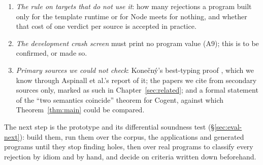 \begin{enumerate}
decides whether a value-conditional summary is worth its cost; the promises themselves are kept (O2).
\item \emph{The rule on targets that do not use it}: how many rejections a program built only for the
template runtime or for Node meets for nothing, and whether that cost of one verdict per source is
accepted in practice.
\item \emph{The development crash screen} must print no program value (A9); this is to be confirmed, or
made so.
\item \emph{Primary sources we could not check}: Kone\v{c}n\'y's best-typing proof
\citep{konecny2003typing}, which we know through Aspinall et al.'s report of it; the papers we cite from
secondary sources only, marked as such in Chapter~\ref{sec:related}; and a formal statement of the ``two
semantics coincide'' theorem for Cogent, against which Theorem~\ref{thm:main} could be compared.
\end{enumerate}

The next step is the prototype and its differential soundness test (\S\ref{sec:eval-next}): build them, run
them over the corpus, the applications and generated programs until they stop finding holes, then over
real programs to classify every rejection by idiom and by hand, and decide on criteria written down
beforehand.
